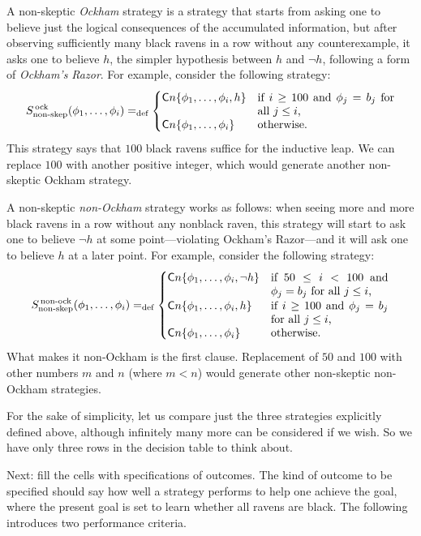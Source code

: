 A non-skeptic {\em Ockham} strategy is a strategy that starts from asking one to believe just the logical consequences of the accumulated information, but after observing sufficiently many black ravens in a row without any counterexample, it asks one to believe $h$, the simpler hypothesis between $h$ and $\neg h$, following a form of {\em Ockham's Razor}. For example, consider the following strategy:
$$S_{\textrm{non-skep}}^{\textrm{\,ock}} (\phi_1, \ldots, \phi_i) =_\text{def} 
	\begin{cases}
	{\mathsf Cn}\{\phi_1, \ldots, \phi_i, h\} & \parbox[t]{.35\textwidth}{if $i \ge 100$ and $\phi_{j} = b_{j}$ for all $j \le i$,}\\
	{\mathsf Cn}\{\phi_1, \ldots, \phi_i\} & \mbox{otherwise.}
	\end{cases}$$
This strategy says that $100$ black ravens suffice for the inductive leap. We can replace $100$ with another positive integer, which would generate another non-skeptic Ockham strategy.

A non-skeptic {\em non-Ockham} strategy works as follows: when seeing more and more black ravens in a row without any nonblack raven, this strategy will start to ask one to believe $\neg h$ at some point---violating Ockham's Razor---and it will ask one to believe $h$ at a later point. For example, consider the following strategy:
$$
S_{\textrm{non-skep}}^{\textrm{\,non-ock}} (\phi_1, \ldots, \phi_i) =_\text{def} 
	\begin{cases}
	{\mathsf Cn}\{\phi_1, \ldots, \phi_i, \neg h\} & \parbox[t]{.3\textwidth}{if $50 \le i < 100$ and $\phi_{j} = b_{j}$ for all $j \le i$,}\\

	{\mathsf Cn}\{\phi_1, \ldots, \phi_i, h\} & \parbox[t]{.3\textwidth}{if $i \ge 100$ and $\phi_{j} = b_{j}$ for all $j \le i$,}\\

	{\mathsf Cn}\{\phi_1, \ldots, \phi_i\} & \mbox{otherwise.}
	\end{cases}
$$
What makes it non-Ockham is the first clause. Replacement of $50$ and $100$ with other numbers $m$ and $n$ (where $m < n$) would generate other non-skeptic non-Ockham strategies. 

For the sake of simplicity, let us compare just the three strategies explicitly defined above, although infinitely many more can be considered if we wish. So we have only three rows in the decision table to think about.

Next: fill the cells  with specifications of outcomes. The kind of outcome to be specified should say how well a strategy performs to help one achieve the goal, where the present goal is set to learn whether all ravens are black. The following introduces two performance criteria.

